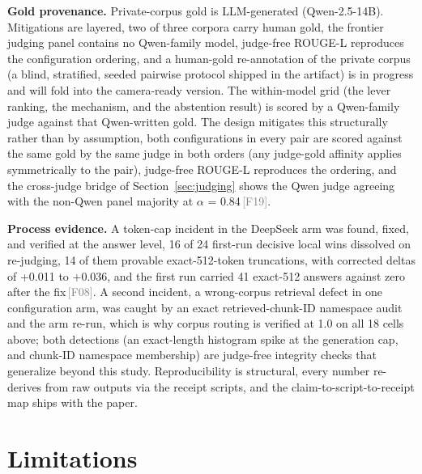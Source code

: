 \documentclass[11pt]{article}
\newcommand{\rcpt}[1]{\textcolor{gray}{\,\textsf{\scriptsize[#1]}}}
\begin{document}
\textbf{Gold provenance.} Private-corpus gold is LLM-generated (Qwen-2.5-14B). Mitigations are layered, two of three corpora carry human gold, the frontier judging panel contains no Qwen-family model, judge-free ROUGE-L reproduces the configuration ordering, and a human-gold re-annotation of the private corpus (a blind, stratified, seeded pairwise protocol shipped in the artifact) is in progress and will fold into the camera-ready version. The within-model grid (the lever ranking, the mechanism, and the abstention result) is scored by a Qwen-family judge against that Qwen-written gold. The design mitigates this structurally rather than by assumption, both configurations in every pair are scored against the same gold by the same judge in both orders (any judge-gold affinity applies symmetrically to the pair), judge-free ROUGE-L reproduces the ordering, and the cross-judge bridge of Section~\ref{sec:judging} shows the Qwen judge agreeing with the non-Qwen panel majority at $\alpha$ = 0.84\rcpt{F19}.

\textbf{Process evidence.} A token-cap incident in the DeepSeek arm was found, fixed, and verified at the answer level, 16 of 24 first-run decisive local wins dissolved on re-judging, 14 of them provable exact-512-token truncations, with corrected deltas of +0.011 to +0.036, and the first run carried 41 exact-512 answers against zero after the fix\rcpt{F08}. A second incident, a wrong-corpus retrieval defect in one configuration arm, was caught by an exact retrieved-chunk-ID namespace audit and the arm re-run, which is why corpus routing is verified at 1.0 on all 18 cells above; both detections (an exact-length histogram spike at the generation cap, and chunk-ID namespace membership) are judge-free integrity checks that generalize beyond this study. Reproducibility is structural, every number re-derives from raw outputs via the receipt scripts, and the claim-to-script-to-receipt map ships with the paper.

\section{Limitations}
\label{sec:limitations}
\end{document}

